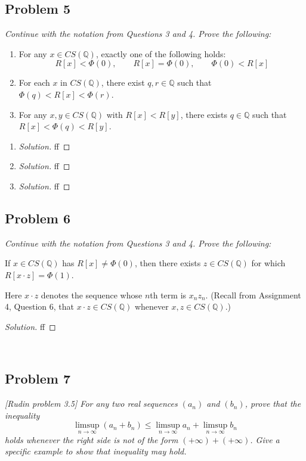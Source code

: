 \documentclass{article}
\newcommand{\Q}{{\mathbb Q}}
\begin{document}
\subsection*{Problem 5}
{\it Continue with the notation from Questions 3 and 4. Prove the following:
\begin{enumerate}
	\item For any $x \in CS(\Q)$, exactly one of the following holds:
		\[
			R[x] < \Phi(0), \qquad R[x] = \Phi(0), \qquad \Phi(0) < R[x]
		\]
	\item For each $x$ in $CS(\Q)$, there exist $q,r\in\Q$
		such that $\Phi(q) < R[x] < \Phi(r)$.
	\item For any $x,y \in CS(\Q)$ with $R[x] < R[y]$,
		there exists $q \in \Q$ such that $R[x] < \Phi(q) < R[y]$.
\end{enumerate}}

\begin{enumerate}
	\item \begin{proof}[Solution]\let\qed\relax
		ff
	\end{proof}
	\item \begin{proof}[Solution]\let\qed\relax
		ff
	\end{proof}
	\item \begin{proof}[Solution]\let\qed\relax
		ff
	\end{proof} 
\end{enumerate}
\clearpage

\subsection*{Problem 6}
{\it Continue with the notation from Questions 3 and 4. Prove the following:
\begin{center}
	If $x \in CS(\Q)$ has $R[x] \neq \Phi(0)$,
	then there exists $z \in CS(\Q)$ for which $R[x\cdot z] = \Phi(1)$.
\end{center}
Here $x \cdot z$ denotes the sequence whose $n$th term is $x_nz_n$.
(Recall from Assignment 4, Question 6,
that $x\cdot z \in CS(\Q)$ whenever $x,z \in CS(\Q)$.)}

\begin{proof}[Solution]\let\qed\relax
	ff
\end{proof}
\clearpage
~\clearpage

\subsection*{Problem 7}
{\it [Rudin problem 3.5]
For any two real sequences $(a_n)$ and $(b_n)$, prove that the inequality
\[
	\limsup_{n\to\infty}(a_n + b_n) \leq \limsup_{n\to\infty}a_n + \limsup_{n\to\infty}b_n
\]
holds whenever the right side is not of the form $(+\infty) + (+\infty)$.
Give a specific example to show that inequality may hold.}
\end{document}
